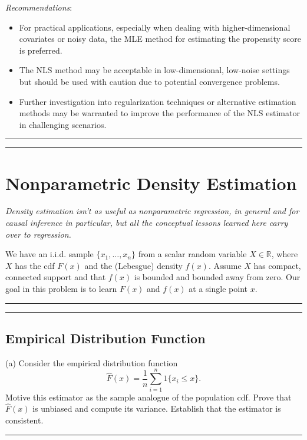 \documentclass{article}
\newenvironment{colorparagraph}[1]{\par\color{#1}}{\par}
\begin{document}
\textit{Recommendations}:

\begin{itemize}
    \item For practical applications, especially when dealing with higher-dimensional covariates or noisy data, the MLE method for estimating the propensity score is preferred.
    \item The NLS method may be acceptable in low-dimensional, low-noise settings but should be used with caution due to potential convergence problems.
    \item Further investigation into regularization techniques or alternative estimation methods may be warranted to improve the performance of the NLS estimator in challenging scenarios.
\end{itemize}

\begin{colorparagraph}{questioncolor}

\rule{\textwidth}{0.5pt}
\label{q2}
\rule{\textwidth}{0.5pt}
\section{Nonparametric Density Estimation}

\textit{Density estimation isn't as useful as nonparametric regression, in general and for causal inference in particular, but all the conceptual lessons learned here carry over to regression.}

We have an i.i.d. sample \(\{x_1, \dots, x_n\}\) from a scalar random variable \( X \in \mathbb{R} \), where \( X \) has the cdf \( F(x) \) and the (Lebesgue) density \( f(x) \). Assume \( X \) has compact, connected support and that \( f(x) \) is bounded and bounded away from zero. Our goal in this problem is to learn \( F(x) \) and \( f(x) \) at a single point \( x \).

\rule{\textwidth}{0.5pt}
\end{colorparagraph}

\begin{colorparagraph}{questioncolor}
\label{q2a}
\rule{\textwidth}{0.5pt}
\subsection{Empirical Distribution Function}
(a) Consider the empirical distribution function
\[
\hat{F}(x) = \frac{1}{n} \sum_{i=1}^n 1\{x_i \leq x\}.
\]
Motive this estimator as the sample analogue of the population cdf. Prove that \( \hat{F}(x) \) is unbiased and compute its variance. Establish that the estimator is consistent.

\rule{\textwidth}{0.5pt}
\end{colorparagraph}
\end{document}
